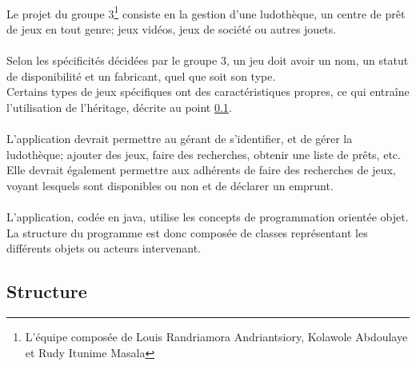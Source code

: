 \paragraph{}
Le projet du groupe 3\footnote{L'équipe composée de Louis Randriamora Andriantsiory, Kolawole Abdoulaye et Rudy Itunime Masala} consiste en la gestion d'une ludothèque, un centre de prêt de jeux en tout genre; jeux vidéos, jeux de société ou autres jouets.
\paragraph{}
Selon les spécificités décidées par le groupe 3, un jeu doit avoir un nom, un statut de disponibilité et un fabricant, quel que soit son type.\\
Certains types de jeux spécifiques ont des caractéristiques propres, ce qui entraîne l'utilisation de l'héritage, décrite au point \ref{subsection:structure}.
\paragraph{}
L'application devrait permettre au gérant de s'identifier, et de gérer la ludothèque; ajouter des jeux, faire des recherches, obtenir une liste de prêts, etc. \\
Elle devrait également permettre aux adhérents de faire des recherches de jeux, voyant lesquels sont disponibles ou non et de déclarer un emprunt.
\paragraph{}
L'application, codée en java, utilise les concepts de programmation orientée objet. La structure du programme est donc composée de classes représentant les différents objets ou acteurs intervenant. 

\subsection{Structure}
    \label{subsection:structure}
